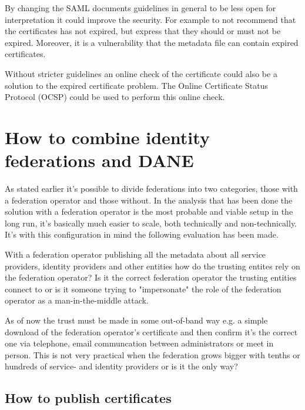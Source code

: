 By changing the SAML documents guidelines in general to be less open for interpretation it could improve the security. 
For example to not recommend that the certificates has not expired, but express that they should or must not be expired. 
Moreover, it is a vulnerability that the metadata file can contain expired certificates.

Without stricter guidelines an online check of the certificate could also be a solution to the expired certificate problem. 
The Online Certificate Status Protocol (OCSP) \cite{rfc:6277} could be used to perform this online check.

\section{How to combine identity federations and DANE}
As stated earlier it's possible to divide federations into two categories, those with a federation operator and those without.
In the analysis that has been done the solution with a federation operator is the most probable and viable setup in the long run, it's basically much easier to scale, both technically and non-technically.
It's with this configuration in mind the following evaluation has been made.


With a federation operator publishing all the metadata about all service providers, identity providers and other entities how do the trusting entites rely on the federation operator?
Is it the correct federation operator the trusting entities connect to or is it someone trying to "impersonate" the role of the federation operator as a man-in-the-middle attack.

As of now the trust must be made in some out-of-band way e.g. a simple download of the federation operator's certificate and then confirm it's the correct one via telephone, email communcation between administrators or meet in person.
This is not very practical when the federation grows bigger with tenths or hundreds of service- and identity providers or is it the only way?
\subsection{How to publish certificates}
